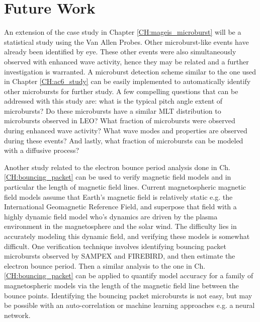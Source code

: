 \section{Future Work}
An extension of the case study in Chapter \ref{CH:mageis_microburst} will be a statistical study using the Van Allen Probes. Other microburst-like events have already been identified by eye. These other events were also simultaneously observed with enhanced wave activity, hence they may be related and a further investigation is warranted. A microburst detection scheme similar to the one used in Chapter \ref{CH:ac6_study} can be easily implemented to automatically identify other microbursts for further study. A few compelling questions that can be addressed with this study are: what is the typical pitch angle extent of microbursts? Do these microbursts have a similar MLT distribution to microbursts observed in LEO? What fraction of microbursts were observed during enhanced wave activity? What wave modes and properties are observed during these events? And lastly, what fraction of microbursts can be modeled with a diffusive process?

Another study related to the electron bounce period analysis done in Ch. \ref{CH:bouncing_packet} can be used to verify magnetic field models and in particular the length of magnetic field lines. Current magnetospheric magnetic field models assume that Earth's magnetic field is relatively static e.g. the International Geomagnetic Reference Field, and superpose that field with a highly dynamic field model who's dynamics are driven by the plasma environment in the magnetosphere and the solar wind. The difficulty lies in accurately modeling this dynamic field, and verifying these models is somewhat difficult. One verification technique involves identifying bouncing packet microbursts observed by SAMPEX and FIREBIRD, and then estimate the electron bounce period. Then a similar analysis to the one in Ch. \ref{CH:bouncing_packet} can be applied to quantify model accuracy for a family of magnetospheric models via the length of the magnetic field line between the bounce points. Identifying the bouncing packet microbursts is not easy, but may be possible with an auto-correlation or machine learning approaches e.g. a neural network.

